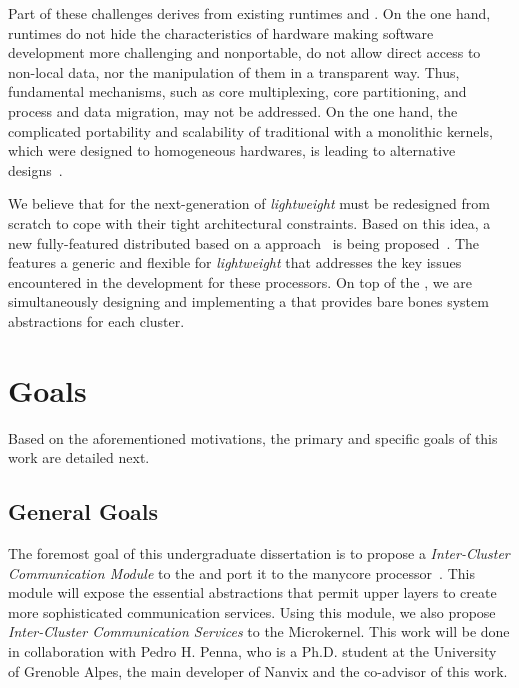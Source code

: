 	Part of these challenges derives from existing runtimes and \oses.
	On the one hand, runtimes do not hide the characteristics of hardware making
	software development more challenging and nonportable, \eg do not allow
	direct access to non-local data, nor the manipulation of them in a transparent way.
	Thus, fundamental \os mechanisms, such as core multiplexing, core partitioning,
	and process and data migration, may not be addressed.
	On the one hand, the complicated portability and scalability of traditional \oses with a
	monolithic kernels, which were designed to homogeneous hardwares, is leading to alternative
	\os designs~\cite{Baumann2009, kluge2014, nightingale2009, rhoden2011}.

	We believe that \oses for the next-generation of \textit{lightweight} \manycores must be
	redesigned from scratch to cope with their tight architectural constraints.
	Based on this idea, a new fully-featured distributed \os based on a \multikernel approach~\cite{Baumann2009}
	is being proposed~\cite{penna2017-1,penna2017-2,penna2019}.
	The \nanvix \multikernel features a generic and flexible \hal for \textit{lightweight} \manycores that
	addresses the key issues encountered in the development for these processors.
	On top of the \nanvix \hal, we are simultaneously designing and implementing a \microkernel
	that provides bare bones system abstractions for each cluster.

\section{Goals}
\label{sec.goals}

	Based on the aforementioned motivations, the primary and specific goals of this work are detailed next.

\subsection{General Goals}
\label{sec.goals.general}

	The foremost goal of this undergraduate dissertation is to propose a \textit{Inter-Cluster Communication Module}
	to the \nanvix \hal and port it to the \mppa manycore processor~\cite{DeDinechin2013-1}.
	This module will expose the essential abstractions that permit upper layers to create more
	sophisticated communication services.
	Using this module, we also propose \textit{Inter-Cluster Communication Services} to the \nanvix Microkernel.
	This work will be done in collaboration with Pedro H. Penna, who is a Ph.D. student at the
	University of Grenoble Alpes, the main developer of Nanvix and the co-advisor of this work.

